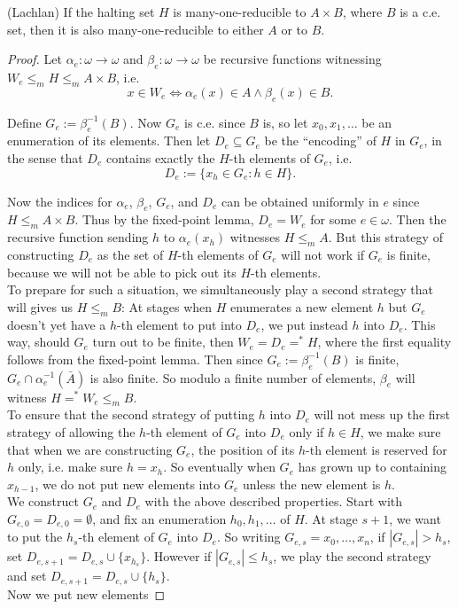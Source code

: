 \begin{theorem}
  (Lachlan) If the halting set $H$ is many-one-reducible to $A\times B$,
  where $B$ is a c.e. set, then it is also many-one-reducible to either $A$
  or to $B$.
\end{theorem}
\begin{proof}
  Let $\alpha_e:\omega \rightarrow\omega$ and $\beta_e:\omega
  \rightarrow\omega$ be recursive functions witnessing $W_e\leq_m H\leq_m
  A\times B$, i.e.
  \[x\in W_e \Leftrightarrow \alpha_e(x)\in A \wedge \beta_e(x)\in B.\]

  Define $G_e:=\beta_e^{-1}(B)$. Now $G_e$ is c.e. since $B$ is, so let
  $x_0,x_1,\ldots$ be an enumeration of its elements. Then let
  $D_e\subseteq G_e$ be the ``encoding'' of $H$ in $G_e$, in the sense that
  $D_e$ contains exactly the $H$-th elements of $G_e$, i.e.
  \[D_e :=\{x_h\in G_e: h\in H\}.\]

  Now the indices for $\alpha_e$, $\beta_e$, $G_e$, and $D_e$ can be
  obtained uniformly in $e$ since $H\leq_m A\times B$. Thus by the
  fixed-point lemma, $D_e=W_e$ for some $e\in\omega$. Then the recursive
  function sending $h$ to $\alpha_e(x_h)$ witnesses $H\leq_m A$. But this
  strategy of constructing $D_e$ as the set of $H$-th elements of $G_e$
  will not work if $G_e$ is finite, because we will not be able to pick out
  its $H$-th elements.\\

  To prepare for such a situation, we simultaneously play a second strategy
  that will gives us $H\leq_m B$: At stages when $H$ enumerates a new
  element $h$ but $G_e$ doesn't yet have a $h$-th element to put into
  $D_e$, we put instead $h$ into $D_e$. This way, should $G_e$ turn out to
  be finite, then $W_e=D_e=^*H$, where the first equality follows from the
  fixed-point lemma. Then since $G_e:=\beta_e^{-1}(B)$ is finite,
  $G_e\cap \alpha_e^{-1}(\bar{A})$ is also finite. So modulo a finite
  number of elements, $\beta_e$ will witness $H=^*W_e\leq_m B$.\\

  To ensure that the second strategy of putting $h$ into $D_e$ will not
  mess up the first strategy of allowing the $h$-th element of $G_e$ into
  $D_e$ only if $h\in H$, we make sure that when we are constructing $G_e$,
  the position of its $h$-th element is reserved for $h$ only, i.e. make
  sure $h=x_h$. So eventually when $G_e$ has grown up to containing
  $x_{h-1}$, we do not put new elements into $G_e$ unless the new element
  is $h$.\\

  We construct $G_e$ and $D_e$ with the above described properties. Start
  with $G_{e,0}=D_{e,0}=\emptyset$, and fix an enumeration $h_0,h_1,\ldots$
  of $H$. At stage $s+1$, we want to put the $h_s$-th element of $G_e$
  into $D_e$. So writing $G_{e,s}=x_0,\ldots,x_n$, if $|G_{e,s}|>h_s$, set
  $D_{e,s+1} =D_{e,s} \cup \{x_{h_s}\}$. However if $|G_{e,s}|\leq h_s$, we
  play the second strategy and set $D_{e,s+1} =D_{e,s} \cup \{h_s\}$.\\

  Now we put new elements
\end{proof}
